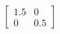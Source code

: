 \documentclass[preview]{standalone}
\begin{document}
\begin{align*}
\begin{bmatrix} 1.5 & 0 \\ 0 & 0.5 \end{bmatrix}
\end{align*}
\end{document}
